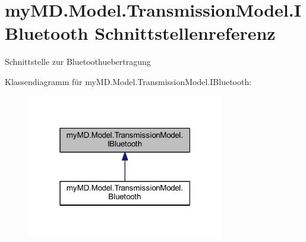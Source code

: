 \hypertarget{interfacemy_m_d_1_1_model_1_1_transmission_model_1_1_i_bluetooth}{}\section{my\+M\+D.\+Model.\+Transmission\+Model.\+I\+Bluetooth Schnittstellenreferenz}
\label{interfacemy_m_d_1_1_model_1_1_transmission_model_1_1_i_bluetooth}


Schnittstelle zur Bluetoothuebertragung  




Klassendiagramm für my\+M\+D.\+Model.\+Transmission\+Model.\+I\+Bluetooth\+:\nopagebreak
\begin{figure}[H]
\begin{center}
\leavevmode
\includegraphics[width=244pt]{interfacemy_m_d_1_1_model_1_1_transmission_model_1_1_i_bluetooth__inherit__graph}
\end{center}
\end{figure}
